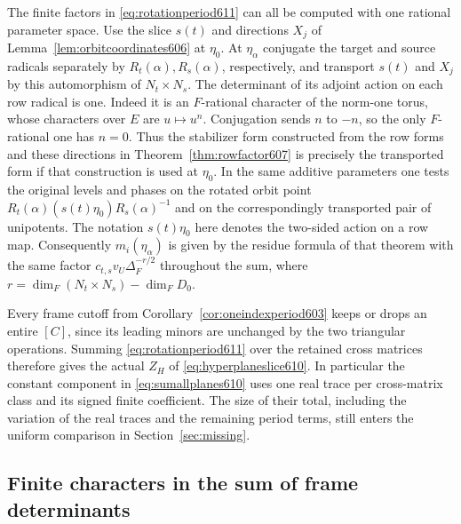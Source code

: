 \documentclass[a4paper,11pt]{article}
\theoremstyle{definition}
\theoremstyle{remark}
\numberwithin{equation}{section}
\begin{document}
The finite factors in \eqref{eq:rotationperiod611} can all be
computed with one rational parameter space. Use the slice
\(s(t)\) and directions \(X_j\) of Lemma~\ref{lem:orbitcoordinates606}
at \(\eta_0\). At \(\eta_\alpha\) conjugate the target and source
radicals separately by \(R_t(\alpha),R_s(\alpha)\), respectively,
and transport \(s(t)\) and \(X_j\) by this automorphism of
\(N_t\times N_s\). The determinant of its adjoint action on each
row radical is one. Indeed it is an \(F\)-rational character of
the norm-one torus, whose characters over \(E\) are \(u\mapsto u^n\).
Conjugation sends \(n\) to \(-n\), so the only \(F\)-rational
one has \(n=0\). Thus the stabilizer form constructed from the
row forms and these directions in Theorem~\ref{thm:rowfactor607}
is precisely the transported form if that construction is used
at \(\eta_0\). In the same additive parameters one tests the
original levels and phases on the rotated orbit point
\(R_t(\alpha)(s(t)\eta_0)R_s(\alpha)^{-1}\) and on the
correspondingly transported pair of unipotents. The notation
\(s(t)\eta_0\) here denotes the two-sided action on a row map.
Consequently \(m_i(\eta_\alpha)\) is given by the residue formula
of that theorem with the same factor
\(c_{t,s}v_U\Delta_F^{-r/2}\) throughout the sum, where
\(r=\dim_F(N_t\times N_s)-\dim_FD_0\).

Every frame cutoff from Corollary~\ref{cor:oneindexperiod603}
keeps or drops an entire \([C]\), since its leading minors are
unchanged by the two triangular operations. Summing
\eqref{eq:rotationperiod611} over the retained cross matrices
therefore gives the actual \(Z_H\) of \eqref{eq:hyperplaneslice610}.
In particular the constant component in \eqref{eq:sumallplanes610}
uses one real trace per cross-matrix class and its signed finite
coefficient. The size of their total, including the variation of
the real traces and the remaining period terms, still enters
the uniform comparison in Section~\ref{sec:missing}.


\subsection{Finite characters in the sum of frame determinants}
\label{sec:rotationcharacters612}
\end{document}
